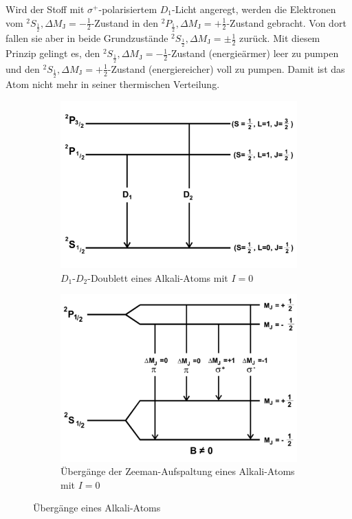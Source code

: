 Wird der Stoff mit $\sigma^{+}$-polarisiertem $D_{1}$-Licht angeregt, werden die Elektronen vom $^{2}S_{\frac{1}{2}}, \Delta M_{\text{J}}= -\frac{1}{2}$-Zustand in den $^{2}P_{\frac{1}{2}}, \Delta M_{\text{J}}= +\frac{1}{2}$-Zustand gebracht.
Von dort fallen sie aber in beide Grundzustände $^{2}S_{\frac{1}{2}}, \Delta M_{\text{J}}= \pm \frac{1}{2}$ zurück.
Mit diesem Prinzip gelingt es, den $^{2}S_{\frac{1}{2}}, \Delta M_{\text{J}}= -\frac{1}{2}$-Zustand (energieärmer) leer zu pumpen und den $^{2}S_{\frac{1}{2}}, \Delta M_{\text{J}}= +\frac{1}{2}$-Zustand (energiereicher) voll zu pumpen.
Damit ist das Atom nicht mehr in seiner thermischen Verteilung.
\begin{figure}[h!]
 \centering
 \begin{subfigure}{0.48\textwidth}
  \centering
  \includegraphics[width=\textwidth]{doublett.pdf}
  \caption{$D_{1}$-$D_{2}$-Doublett eines Alkali-Atoms mit $I=0$}
  \label{fig:doublett}
 \end{subfigure}
 \begin{subfigure}{0.48\textwidth}
  \centering
  \includegraphics[width=\textwidth]{sigmaplus.pdf}
  \caption{Übergänge der Zeeman-Aufspaltung eines Alkali-Atoms mit $I=0$}
  \label{fig:sigmaplus}
 \end{subfigure}
 \caption{Übergänge eines Alkali-Atoms}
 \label{fig:übergänge}
\end{figure}
